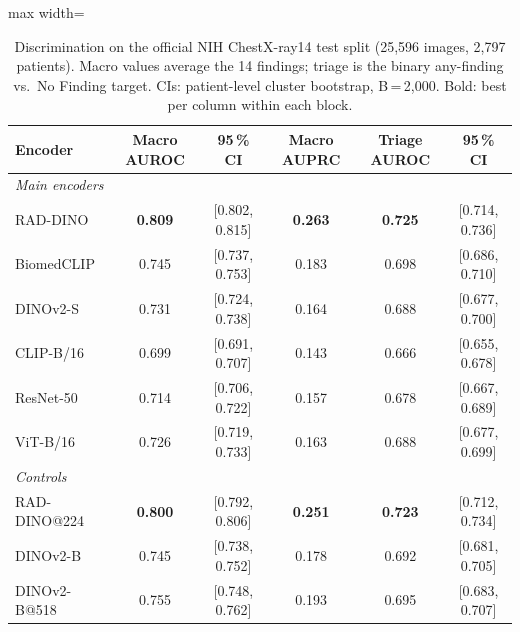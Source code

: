 \begin{table}[H]\centering
\footnotesize
\caption{Discrimination on the official NIH ChestX-ray14 test split (25,596 images, 2,797 patients). Macro values average the 14 findings; triage is the binary any-finding vs.\ No Finding target. CIs: patient-level cluster bootstrap, B\,=\,2,000. Bold: best per column within each block.}\label{tab:macro}
\begin{adjustbox}{max width=\linewidth}
\begin{tabular}{lccccc}
\toprule
Encoder & Macro AUROC & 95\,\% CI & Macro AUPRC & Triage AUROC & 95\,\% CI \\
\midrule

\multicolumn{6}{l}{\emph{Main encoders}} \\
RAD-DINO & \textbf{0.809} & [0.802, 0.815] & \textbf{0.263} & \textbf{0.725} & [0.714, 0.736] \\
BiomedCLIP & 0.745 & [0.737, 0.753] & 0.183 & 0.698 & [0.686, 0.710] \\
DINOv2-S & 0.731 & [0.724, 0.738] & 0.164 & 0.688 & [0.677, 0.700] \\
CLIP-B/16 & 0.699 & [0.691, 0.707] & 0.143 & 0.666 & [0.655, 0.678] \\
ResNet-50 & 0.714 & [0.706, 0.722] & 0.157 & 0.678 & [0.667, 0.689] \\
ViT-B/16 & 0.726 & [0.719, 0.733] & 0.163 & 0.688 & [0.677, 0.699] \\
\midrule
\multicolumn{6}{l}{\emph{Controls}} \\
RAD-DINO@224 & \textbf{0.800} & [0.792, 0.806] & \textbf{0.251} & \textbf{0.723} & [0.712, 0.734] \\
DINOv2-B & 0.745 & [0.738, 0.752] & 0.178 & 0.692 & [0.681, 0.705] \\
DINOv2-B@518 & 0.755 & [0.748, 0.762] & 0.193 & 0.695 & [0.683, 0.707] \\
\bottomrule
\end{tabular}
\end{adjustbox}
\end{table}
